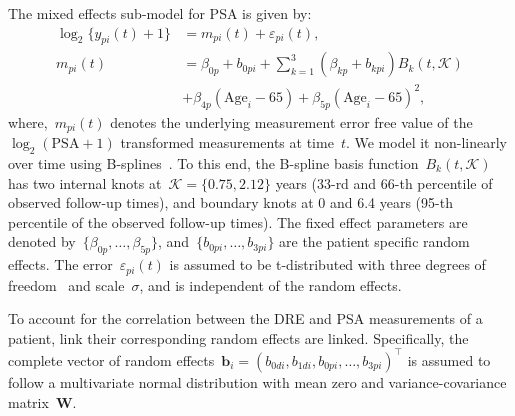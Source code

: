 \begin{subappendices}
The mixed effects sub-model for PSA is given by:
\begin{equation}
\label{c4:eq:long_model_psa}
\begin{split}
    \log_2 \big\{y_{pi}(t) + 1\big\} &= m_{pi}(t) + \varepsilon_{pi}(t),\\
    m_{pi}(t) &= \beta_{0p} + b_{0pi} + \sum_{k=1}^3 (\beta_{kp} + b_{kpi})  B_k(t,\mathcal{K})\\ 
    &+ \beta_{4p} (\mbox{Age}_i-65) + \beta_{5p} (\mbox{Age}_i-65)^2,
    \end{split}
\end{equation}
where,~$m_{pi}(t)$ denotes the underlying measurement error free value of the $\log_2 (\mbox{PSA} + 1)$ transformed \citep{tomer2019personalized} measurements at time~$t$. We model it non-linearly over time using B-splines~\citep{de1978practical}. To this end, the B-spline basis function~$B_k(t, \mathcal{K})$ has two internal knots at~$\mathcal{K} = \{0.75, 2.12\}$ years (33-rd and 66-th percentile of observed follow-up times), and boundary knots at 0 and 6.4 years (95-th percentile of the observed follow-up times). The fixed effect parameters are denoted by~${\{\beta_{0p},\ldots,\beta_{5p}\}}$, and~${\{b_{0pi}, \ldots, b_{3pi}\}}$ are the patient specific random effects. The error~$\varepsilon_{pi}(t)$ is assumed to be t-distributed with three degrees of freedom~\citep{tomer2019personalized} and scale~$\sigma$, and is independent of the random effects. 

To account for the correlation between the DRE and PSA measurements of a patient, link their corresponding random effects are linked. Specifically, the complete vector of random effects~${\boldsymbol{b}_i = (b_{0di}, b_{1di}, b_{0pi}, \ldots, b_{3pi})^\top}$ is assumed to follow a multivariate normal distribution with mean zero and variance-covariance matrix~$\boldsymbol{W}$.


\end{subappendices}
